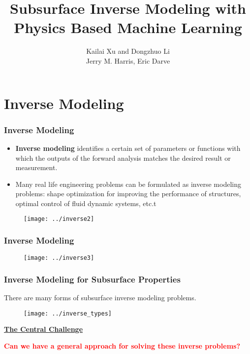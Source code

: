 \documentclass[usenames,dvipsnames]{beamer}
\title[Physics Constrained Learning]{Subsurface Inverse Modeling with Physics Based Machine Learning} %
\author[Kailai Xu (\texttt{kailaix@stanford.edu}), et al.]{Kailai Xu and Dongzhuo Li\\ Jerry M. Harris,  Eric Darve}%
\date{}%
\begin{document}
\begin{frame}

\titlepage %


\end{frame}
\usebackgroundtemplate{}

\section{Inverse Modeling}



\begin{frame}
	\frametitle{Inverse Modeling}
	\begin{itemize}
		\item \textbf{Inverse modeling} identifies a certain set of parameters or functions with which the outputs of the forward analysis matches the desired result or measurement.
		\item Many real life engineering problems can be formulated as inverse modeling problems: shape optimization for improving the performance of structures, optimal control of fluid dynamic systems, etc.t
	\end{itemize}
	\begin{figure}[hbt]
	\centering
  \texttt{[image: ../inverse2]}
\end{figure}
\end{frame}

\begin{frame}
	\frametitle{Inverse Modeling}
	\begin{figure}
	\centering
  \texttt{[image: ../inverse3]}
\end{figure}
\end{frame}

\begin{frame}
	\frametitle{Inverse Modeling for Subsurface Properties}
	 
	 There are many forms of subsurface inverse modeling problems.
	 
	 	\begin{figure}
	 	\centering
	 	\texttt{[image: ../inverse\_types]}
	 \end{figure}

\begin{center}
	\textbf{\underline{The Central Challenge}}
\end{center}	 
	\begin{center}
\textcolor{red}{\textbf{Can we have a general approach for solving these inverse problems?}}
\end{center}

\end{frame}
\end{document}
